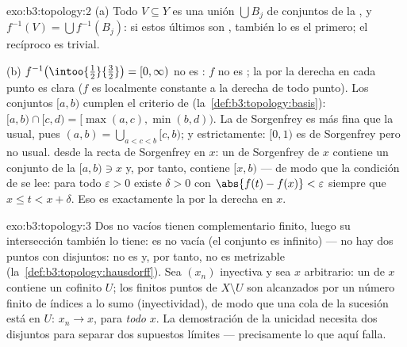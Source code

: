 \begin{solution}{exo:b3:topology:2}
(a) Todo  $V \subseteq Y$ es una unión $\bigcup B_j$ de conjuntos
de la , y
$f^{-1}(V) = \bigcup f^{-1}(B_j)$: si estos últimos son ,
también lo es el primero; el recíproco es trivial.

(b) $f^{-1}\bigl(\intoo{\frac12}{\frac32}\bigr) = [0, \infty)$
no es : $f$ no es ;
la  por la derecha en
cada punto es clara ($f$ es localmente constante a la derecha de todo
punto). Los conjuntos $[a, b)$ cumplen el criterio de
 (la~\cref{def:b3:topology:basis}):
$[a,b)\cap[c,d) = [\max(a,c),
\min(b,d))$. La  de
Sorgenfrey es más fina que la usual, pues
$(a, b) = \bigcup_{a < c < b}[c, b)$; y estrictamente: $[0,1)$ es
 de Sorgenfrey pero no  usual.
 desde la recta de
Sorgenfrey en $x$: un  de
Sorgenfrey de $x$ contiene un conjunto de la
 $[a, b) \ni x$ y, por tanto,
contiene $[x, b)$ --- de modo que la condición de
 se lee: para todo
$\varepsilon > 0$ existe $\delta > 0$ con
$\abs{f(t) - f(x)} < \varepsilon$ siempre que $x \leq t < x + \delta$.
Eso es exactamente la 
por la derecha en $x$.
\end{solution}

\begin{solution}{exo:b3:topology:3}
Dos  no vacíos tienen complementario finito, luego su
intersección también lo tiene: es no vacía (el conjunto es infinito) ---
no hay dos puntos con 
disjuntos: no es  y, por
tanto, no es metrizable (la~\cref{def:b3:topology:hausdorff}). Sea
$(x_n)$ inyectiva y sea $x$ arbitrario: un
 de $x$ contiene un 
cofinito $U$; los finitos puntos de $X\setminus U$ son alcanzados por un
número finito de índices a lo sumo (inyectividad), de modo que una cola
de la sucesión está en $U$: $x_n \to x$, para \emph{todo} $x$. La
demostración de la unicidad necesita dos
 disjuntos para separar dos
supuestos límites --- precisamente lo que aquí falla.
\end{solution}


